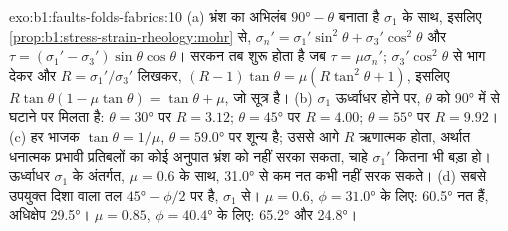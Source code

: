 \begin{solution}{exo:b1:faults-folds-fabrics:10}
(a) भ्रंश का अभिलंब $\ang{90} - \theta$ बनाता है $\sigma_1$ के साथ, इसलिए \cref{prop:b1:stress-strain-rheology:mohr} से,
$\sigma_n' = \sigma_1'\sin^2\theta + \sigma_3'\cos^2\theta$ और $\tau = (\sigma_1' - \sigma_3')\sin\theta\cos\theta$। सरकन तब शुरू होता है जब $\tau = \mu\sigma_n'$; $\sigma_3'\cos^2\theta$ से भाग देकर और $R = \sigma_1'/\sigma_3'$ लिखकर, $(R - 1)\tan\theta = \mu(R\tan^2\theta + 1)$, इसलिए $R\tan\theta(1 - \mu\tan\theta) = \tan\theta + \mu$, जो सूत्र है। (b) $\sigma_1$ ऊर्ध्वाधर होने पर, $\theta$  को \ang{90} में से घटाने पर मिलता है: $\theta = \ang{30}$ पर $R = 3.12$; $\theta = \ang{45}$ पर $R = 4.00$; $\theta = \ang{55}$ पर $R = 9.92$। (c) हर भाजक $\tan\theta = 1/\mu$, $\theta = \ang{59.0}$ पर शून्य है; उससे आगे $R$ ऋणात्मक होता, अर्थात धनात्मक प्रभावी प्रतिबलों का कोई अनुपात भ्रंश को नहीं सरका सकता, चाहे $\sigma_1'$ कितना भी बड़ा हो। ऊर्ध्वाधर $\sigma_1$ के अंतर्गत, $\mu = 0.6$ के साथ, \ang{31.0} से कम नत  कभी नहीं सरक सकते। (d) सबसे उपयुक्त दिशा वाला तल $\ang{45} - \phi/2$ पर है, $\sigma_1$ से। $\mu = 0.6$, $\phi = \ang{31.0}$ के लिए:  \ang{60.5} नत हैं, अधिक्षेप \ang{29.5}। $\mu = 0.85$, $\phi = \ang{40.4}$ के लिए: \ang{65.2} और \ang{24.8}।
\end{solution}

